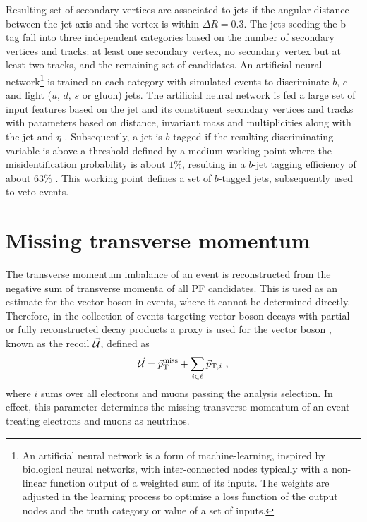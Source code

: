 Resulting set of secondary vertices are associated to jets if the angular distance between the jet axis and the vertex is within ${\Delta R=0.3}$. The jets seeding the b-tag fall into three independent categories based on the number of secondary vertices and tracks: at least one secondary vertex, no secondary vertex but at least two tracks, and the remaining set of candidates. An artificial neural network\footnote{An artificial neural network is a form of machine-learning, inspired by biological neural networks, with inter-connected nodes typically with a non-linear function output of a weighted sum of its inputs. The weights are adjusted in the learning process to optimise a loss function of the output nodes and the truth category or value of a set of inputs.} is trained on each category with simulated events to discriminate $b$, $c$ and light ($u$, $d$, $s$ or gluon) jets. The artificial neural network is fed a large set of input features based on the jet and its constituent secondary vertices and tracks with parameters based on distance, invariant mass and multiplicities along with the jet \pt and $\eta$ \cite{Sirunyan:2017ezt}. Subsequently, a jet is $b$-tagged if the resulting discriminating variable is above a threshold defined by a medium working point where the misidentification probability is about $1\%$, resulting in a $b$-jet tagging efficiency of about $63\%$ \cite{Sirunyan:2017ezt}. This working point defines a set of $b$-tagged jets, subsequently used to veto events.

\section{Missing transverse momentum}

The transverse momentum imbalance of an event is reconstructed from the negative sum of transverse momenta of all PF candidates. This is used as an estimate for the vector boson \pt in \IZvvj events, where it cannot be determined directly. Therefore, in the collection of events targeting vector boson decays with partial or fully reconstructed decay products a proxy is used for the vector boson \vecpt, known as the recoil $\vec{\mathcal{U}}$, defined as
%
\begin{equation}
    \vec{\mathcal{U}} = \vec{p}_{\mathrm{T}}^{\mathrm{miss}} + \sum_{i\in\ell} \vec{p}_{\mathrm{T},i}\ ,
\end{equation}
%
where $i$ sums over all electrons and muons passing the analysis selection. In effect, this parameter determines the missing transverse momentum of an event treating electrons and muons as neutrinos.


